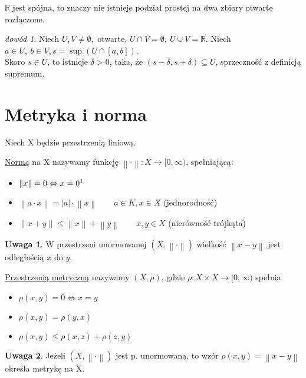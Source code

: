 \documentclass[twoside,10pt]{article}
\newcommand{\norm}[1]{\left\lVert#1\right\rVert}
\theoremstyle{definition}
\theoremstyle{definition}
\theoremstyle{definition}
\theoremstyle{definition}
\theoremstyle{remark}
\newtheorem*{dd}{dowód}
\theoremstyle{definition}
\newtheorem*{uw}{Uwaga}
\theoremstyle{definition}
\theoremstyle{definition}
\theoremstyle{definition}
\theoremstyle{definition}
\theoremstyle{definition}
\begin{document}
\begin{tw} 
    $\mathbb{R}$ jest spójna, to znaczy nie istnieje podział prostej na dwa zbiory otwarte rozłączone.
\end{tw} 
\begin{dd}
    Niech $U,V \neq \emptyset,$ otwarte, $ U \cap V = \emptyset, \ U \cup V = \mathbb{R}$.
    Niech $a \in U, \ b \in V, s = \sup (U \cap [a,b])$. \\ Skoro $s \in U$, to istnieje $\delta > 0$, 
    taka, że $(s-\delta,s+\delta) \subseteq U$, sprzeczność z definicją supremum.
\end{dd}
\section{Metryka i norma}
Niech X będzie przestrzenią liniową.
\begin{df} 
    \underline{Normą} na X nazywamy funkcję $\norm{\cdot}: X \rightarrow [0,\infty)$, spełniającą: 
    \begin{itemize} 
        \item[(N1)] $\norm{x} = 0 \Leftrightarrow x = 0\footnotemark$
        \item[(N2)] $\norm{a\cdot x} = |a| \cdot \norm{x} \qquad a \in K, x \in X$ (jednorodność)
        \item[(N3)] $\norm{x+y} \le \norm{x} + \norm{y} \qquad x,y \in X$ (nierówność trójkąta)
    \end{itemize} 
\end{df} 
\begin{uw}
    W przestrzeni unormowanej $(X,\norm{\cdot})$ wielkość $\norm{x-y}$ jest odległością $x$ do $y$.
\end{uw}
\begin{df} 
    \underline{Przestrzenią metryczną} nazywamy $(X,\rho)$, gdzie $\rho: X \times X \rightarrow [0,\infty)$ spełnia
    \begin{itemize} 
        \item[(M1)] $\rho(x,y) = 0 \Leftrightarrow x = y$
        \item[(M2)] $\rho(x,y) = \rho(y,x)$
        \item[(M3)] $\rho(x,y) \le \rho(x,z)+\rho(z,y)$
    \end{itemize} 
\end{df} 
\begin{uw}
    Jeżeli $(X,\norm{\cdot})$ jest p. unormowaną, to wzór $\rho(x,y) = \norm{x-y}$ określa metrykę na X.
\end{uw}
\end{document}
